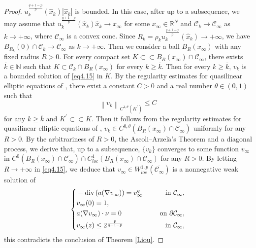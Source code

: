 \documentclass[12pt]{amsart}
\theoremstyle{definition}
\theoremstyle{remark}
\theoremstyle{conclusion}
\theoremstyle{conjecture}
\numberwithin{equation}{section}
\begin{document}
\begin{proof}
 $u_k^{\frac{q+1-p}{p}}(\widehat{x}_k)|\widehat{x}_k|$ is bounded. In this case, after up to a subsequence, we may assume that $u_k^{\frac{q+1-p}{p}}(\widehat{x}_k)\widehat{x}_k\rightarrow x_{\infty}$ for some $x_{\infty}\in\mathbb{R}^N$
and $\mathcal{C}_k\rightarrow\mathcal{C}_{\infty}$ as $k\rightarrow+\infty$, where $\mathcal{C}_{\infty}$ is a convex cone. Since $R_k=\rho_ku_k^{\frac{q+1-p}{p}}(\widehat{x}_k)\rightarrow+\infty$, we have $B_{R_k}(0)\cap\mathcal{C}_k\rightarrow\mathcal{C}_{\infty}$ as $k\rightarrow+\infty$.
Then we consider a ball $B_R(x_{\infty})$ with any fixed radius $R>0$. For every compact set $K\subset\subset B_R(x_{\infty})\cap\mathcal{C}_{\infty}$, there exists $\overline{k}\in\mathbb{N}$ such that $K\subset\mathcal{C}_k\cap B_R(x_{\infty})$ for every $k\geq\overline{k}$.
 Then for every $k\geq\overline{k}$, $v_k$ is a bounded solution of \eqref{eq4.15} in $K$. By the regularity estimates for quasilinear elliptic equations of \cite{Dib}, there exist a constant $C>0$ and a real number $\theta\in(0,1)$ such that
 $$\left\lVert v_k\right\rVert _{C^{1,\theta}(K^{\prime})}\leq C $$
 for any $k\geq\overline{k}$ and $K^{\prime}\subset\subset K$. Then it follows from the regularity estimates for quasilinear elliptic equations of \cite{Per}, $v_k\in C^{0,\theta}(B_R(x_{\infty})\cap\overline{\mathcal{C}_{\infty}})$ uniformly for any $R>0$. By the arbitrariness of $R>0$, the Ascoli--Arzel$\acute{\text{a}} $'s Theorem and a diagonal process, we derive that, up to
 a subsequence, $\{v_k\}$ converges to some function $v_{\infty}$ in $C^0(B_R(x_{\infty})\cap\overline{\mathcal{C}_{\infty}})\cap C^1_{loc}(B_R(x_{\infty})\cap\mathcal{C}_{\infty})$ for any $R>0$. By letting $R\rightarrow+\infty$ in \eqref{eq4.15}, we deduce that $v_{\infty}\in W^{1,p}_{loc}(\overline{\mathcal{C}_{\infty}})$ is a nonnegative weak solution of
\begin{equation*}
    \left\{
        \begin{aligned}
        &-\operatorname{div}\left(a(\nabla v_{\infty})\right)=v_{\infty}^{q} \quad\,\,\, &{\rm{in}} \,\, \mathcal{C}_{\infty}, \\
        &v_{\infty}(0)=1,\\
        &a(\nabla v_{\infty})\cdot \nu =0 \quad\,\,\, &{\rm{on}} \,\, \partial\mathcal{C}_{\infty},\\
        &v_{\infty}(z)\leq 2^{\frac{p}{q+1-p}} \quad\,\,\, &{\rm{in}} \,\, \mathcal{C}_{\infty},
        \end{aligned}
        \right.
\end{equation*}
this contradicts the conclusion of Theorem \ref{Liou}.


\end{proof}
\end{document}
